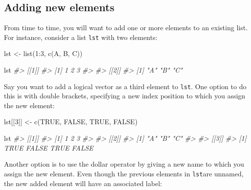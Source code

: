 \documentclass[
]{book}
\newenvironment{Shaded}{\begin{snugshade}}{\end{snugshade}}
\newcommand{\CommentTok}[1]{\textcolor[rgb]{0.56,0.35,0.01}{\textit{#1}}}
\newcommand{\ConstantTok}[1]{\textcolor[rgb]{0.00,0.00,0.00}{#1}}
\newcommand{\DecValTok}[1]{\textcolor[rgb]{0.00,0.00,0.81}{#1}}
\newcommand{\FunctionTok}[1]{\textcolor[rgb]{0.00,0.00,0.00}{#1}}
\newcommand{\NormalTok}[1]{#1}
\newcommand{\OtherTok}[1]{\textcolor[rgb]{0.56,0.35,0.01}{#1}}
\newcommand{\SpecialCharTok}[1]{\textcolor[rgb]{0.00,0.00,0.00}{#1}}
\newcommand{\StringTok}[1]{\textcolor[rgb]{0.31,0.60,0.02}{#1}}
\begin{document}
\hypertarget{adding-new-elements}{%
\subsection{Adding new elements}\label{adding-new-elements}}

From time to time, you will want to add one or more elements to an existing
list. For instance, consider a list \texttt{lst} with two elements:

\begin{Shaded}
\begin{Highlighting}[]
\NormalTok{lst }\OtherTok{\textless{}{-}} \FunctionTok{list}\NormalTok{(}\DecValTok{1}\SpecialCharTok{:}\DecValTok{3}\NormalTok{, }\FunctionTok{c}\NormalTok{(}\StringTok{\textquotesingle{}A\textquotesingle{}}\NormalTok{, }\StringTok{\textquotesingle{}B\textquotesingle{}}\NormalTok{, }\StringTok{\textquotesingle{}C\textquotesingle{}}\NormalTok{))}

\NormalTok{lst}
\CommentTok{\#\textgreater{} [[1]]}
\CommentTok{\#\textgreater{} [1] 1 2 3}
\CommentTok{\#\textgreater{} }
\CommentTok{\#\textgreater{} [[2]]}
\CommentTok{\#\textgreater{} [1] "A" "B" "C"}
\end{Highlighting}
\end{Shaded}

Say you want to add a logical vector as a third element to \texttt{lst}. One option to
do this is with double brackets, specifying a new index position to which you
assign the new element:

\begin{Shaded}
\begin{Highlighting}[]
\NormalTok{lst[[}\DecValTok{3}\NormalTok{]] }\OtherTok{\textless{}{-}} \FunctionTok{c}\NormalTok{(}\ConstantTok{TRUE}\NormalTok{, }\ConstantTok{FALSE}\NormalTok{, }\ConstantTok{TRUE}\NormalTok{, }\ConstantTok{FALSE}\NormalTok{)}

\NormalTok{lst}
\CommentTok{\#\textgreater{} [[1]]}
\CommentTok{\#\textgreater{} [1] 1 2 3}
\CommentTok{\#\textgreater{} }
\CommentTok{\#\textgreater{} [[2]]}
\CommentTok{\#\textgreater{} [1] "A" "B" "C"}
\CommentTok{\#\textgreater{} }
\CommentTok{\#\textgreater{} [[3]]}
\CommentTok{\#\textgreater{} [1]  TRUE FALSE  TRUE FALSE}
\end{Highlighting}
\end{Shaded}

Another option is to use the dollar operator by giving a new name to which you
assign the new element. Even though the previous elements in \texttt{lst}are unnamed,
the new added element will have an associated label:
\end{document}
